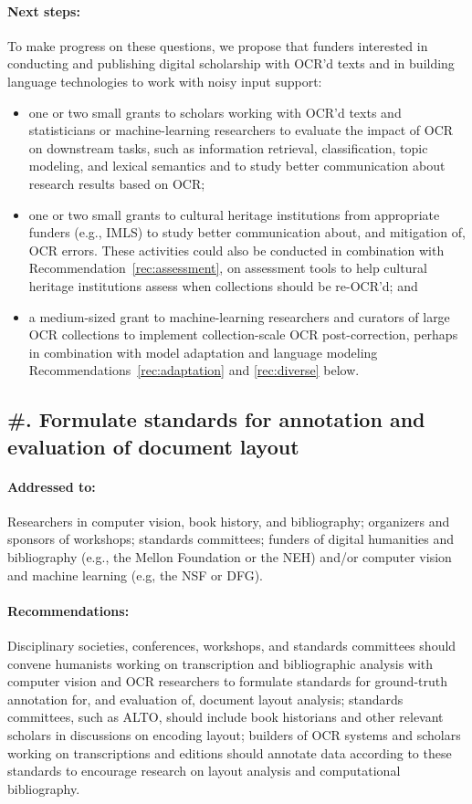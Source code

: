 \documentclass[twoside,11pt]{report}
\newcounter{reccounter}
\renewcommand{\thereccounter}{\arabic{reccounter}}
\newcommand{\recommend}[2]{\refstepcounter{reccounter}%
  \label{rec:#1}%
  \subsection{\#\thereccounter. #2}%
  \label{sec:rec-#1}}
\begin{document}
\paragraph{Next steps:} To make progress on these questions, we propose that funders interested in conducting and publishing digital scholarship with OCR'd texts and in building language technologies to work with noisy input support:
\begin{itemize}

\item one or two small grants to scholars working with OCR'd texts and statisticians or machine-learning researchers to evaluate the impact of OCR on downstream tasks, such as information retrieval, classification, topic modeling, and lexical semantics and to study better communication about research results based on OCR;

\item one or two small grants to cultural heritage institutions from appropriate funders (e.g., IMLS) to study better communication about, and mitigation of, OCR errors. These activities could also be conducted in combination with Recommendation~\ref{rec:assessment}, on assessment tools to help cultural heritage institutions assess when collections should be re-OCR'd; and

\item a medium-sized grant to machine-learning researchers and curators of large OCR collections to implement collection-scale OCR post-correction, perhaps in combination with model adaptation and language modeling Recommendations~\ref{rec:adaptation} and \ref{rec:diverse} below.

\end{itemize}

\recommend{layout}{Formulate standards for annotation and evaluation of document layout}

\paragraph{Addressed to:} Researchers in computer vision, book history, and bibliography; organizers and sponsors of workshops; standards committees; funders of digital humanities and bibliography (e.g., the Mellon Foundation or the NEH) and/or computer vision and machine learning (e.g, the NSF or DFG).

\paragraph{Recommendations:} Disciplinary societies, conferences, workshops, and standards committees should convene humanists working on transcription and bibliographic analysis with computer vision and OCR researchers to formulate standards for ground-truth annotation for, and evaluation of, document layout analysis; standards committees, such as ALTO, should include book historians and other relevant scholars in discussions on encoding layout; builders of OCR systems and scholars working on transcriptions and editions should annotate data according to these standards to encourage research on layout analysis and computational bibliography.
\end{document}
